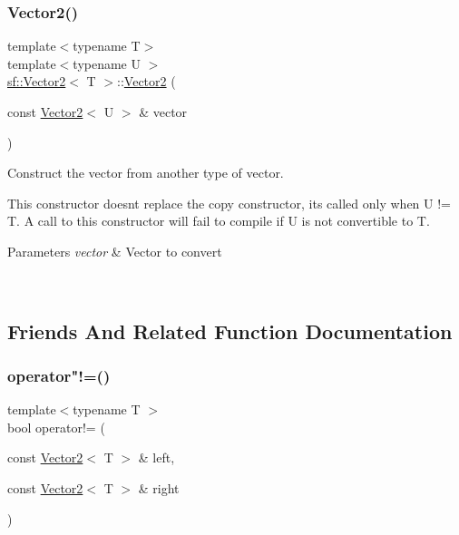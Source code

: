 \subsubsection{\texorpdfstring{Vector2()}{Vector2()}\hspace{0.1cm}{\footnotesize\ttfamily [3/3]}}
{\footnotesize\ttfamily template$<$typename T$>$ \\
template$<$typename U $>$ \\
\mbox{\hyperlink{classsf_1_1_vector2}{sf\+::\+Vector2}}$<$ T $>$\+::\mbox{\hyperlink{classsf_1_1_vector2}{Vector2}} (\begin{DoxyParamCaption}\item[{const \mbox{\hyperlink{classsf_1_1_vector2}{Vector2}}$<$ U $>$ \&}]{vector }\end{DoxyParamCaption})\hspace{0.3cm}{\ttfamily [explicit]}}



Construct the vector from another type of vector. 

This constructor doesn\textquotesingle{}t replace the copy constructor, it\textquotesingle{}s called only when U != T. A call to this constructor will fail to compile if U is not convertible to T.


\begin{DoxyParams}{Parameters}
{\em vector} & Vector to convert \begin{DoxyVerb}\end{DoxyVerb}
 \\
\hline
\end{DoxyParams}


\subsection{Friends And Related Function Documentation}
\mbox{\label{classsf_1_1_vector2_a01673da35ef9c52d0e54b8263549a956}} 
\subsubsection{\texorpdfstring{operator"!=()}{operator!=()}}
{\footnotesize\ttfamily template$<$typename T $>$ \\
bool operator!= (\begin{DoxyParamCaption}\item[{const \mbox{\hyperlink{classsf_1_1_vector2}{Vector2}}$<$ T $>$ \&}]{left,  }\item[{const \mbox{\hyperlink{classsf_1_1_vector2}{Vector2}}$<$ T $>$ \&}]{right }\end{DoxyParamCaption})\hspace{0.3cm}{\ttfamily [related]}}




